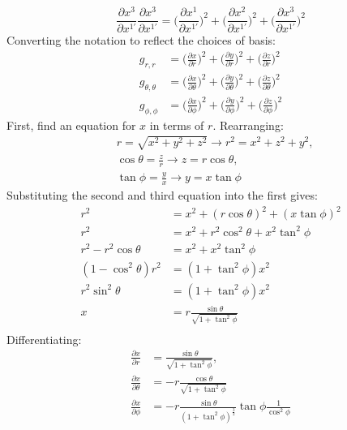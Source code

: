 \documentclass[a4paper]{article}
\begin{document}
\begin{enumerate}
\[    \frac{\partial x^3}{\partial x^{1'}} \frac{\partial x^3}{\partial x^{1'}} =
    \Bigg( \frac{\partial x^1}{\partial x^{1'}}\Bigg)^2+
    \Bigg(\frac{\partial x^2}{\partial x^{1'}}\Bigg)^2+
    \Bigg(\frac{\partial x^3}{\partial x^{1'}}\Bigg)^2
  \]
  Converting the notation to reflect the choices of basis:
  \[
    \begin{align*}
    g_{r,r} &=
    \Bigg( \frac{\partial x}{\partial r}\Bigg)^2+
    \Bigg(\frac{\partial y}{\partial r}\Bigg)^2+
    \Bigg(\frac{\partial z}{\partial r}\Bigg)^2\\
    g_{\theta,\theta} &=
    \Bigg( \frac{\partial x}{\partial \theta}\Bigg)^2+
    \Bigg(\frac{\partial y}{\partial \theta}\Bigg)^2+
    \Bigg(\frac{\partial z}{\partial \theta}\Bigg)^2\\
    g_{\phi,\phi} &=
    \Bigg( \frac{\partial x}{\partial \phi}\Bigg)^2+
    \Bigg(\frac{\partial y}{\partial \phi}\Bigg)^2+
    \Bigg(\frac{\partial z}{\partial \phi}\Bigg)^2
    \end{align*}
  \]
  First, find an equation for $x$ in terms of $r$. Rearranging:
  \[
    \begin{align*}
      &r = \sqrt{x^2 + y^2 + z^2} \to r^2= x^2+z^2+y^2,\\
      &\cos\theta = \frac{z}{r} \to z = r\cos\theta, \\
      &\tan\phi = \frac{y}{x} \to y = x\tan\phi
    \end{align*}
  \]
  Substituting the second and third equation into the first gives:
  \[
    \begin{align*}
      r^2&=x^2+(r\cos\theta)^2+(x\tan\phi)^2\\
      r^2&=x^2+r^2\cos^2\theta+x^2\tan^2\phi\\
      r^2-r^2\cos\theta&=x^2+x^2\tan^2\phi\\
      (1-\cos^2\theta)r^2&=(1+\tan^2\phi)x^2\\
      r^2\sin^2\theta &=(1+\tan^2\phi)x^2\\
      x&=r\frac{\sin\theta}{\sqrt{1+\tan^2\phi}}\\
    \end{align*}
  \]
  Differentiating:
  \[
    \begin{align*}
      \frac{\partial x}{\partial r} &= \frac{\sin\theta}{\sqrt{1+\tan^2\phi}},\\
      \frac{\partial x}{\partial \theta} &= -r\frac{\cos\theta}{\sqrt{1+\tan^2\phi}}\\
      \frac{\partial x}{\partial \phi} &=
      -r\frac{\sin\theta}{(1+\tan^2\phi)^{\frac{3}{2}}}\tan\phi\frac{1}{\cos^2\phi} \\

\end{align*}\]
\end{enumerate}
\end{document}
